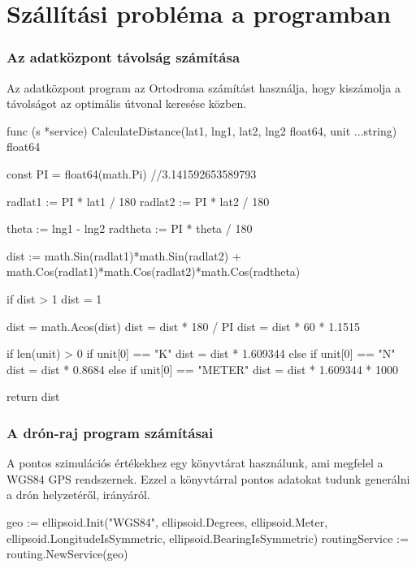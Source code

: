 \newpage

\section{Szállítási probléma a programban}
\subsubsection{Az adatközpont távolság számítása}
Az adatközpont program az Ortodroma számítást használja, hogy kiszámolja a távolságot az optimális útvonal keresése közben.
\begin{python}
    func (s *service) CalculateDistance(lat1, lng1, lat2,
    lng2 float64, unit ...string) float64 {
        const PI = float64(math.Pi) //3.141592653589793

        radlat1 := PI * lat1 / 180
        radlat2 := PI * lat2 / 180

        theta := lng1 - lng2
        radtheta := PI * theta / 180

        dist := math.Sin(radlat1)*math.Sin(radlat2) +
        math.Cos(radlat1)*math.Cos(radlat2)*math.Cos(radtheta)

        if dist > 1 {
            dist = 1
        }

        dist = math.Acos(dist)
        dist = dist * 180 / PI
        dist = dist * 60 * 1.1515

        if len(unit) > 0 {
            if unit[0] == "K" {
                dist = dist * 1.609344
            } else if unit[0] == "N" {
                dist = dist * 0.8684
            } else if unit[0] == "METER" {
                dist = dist * 1.609344 * 1000
            }
        }

        return dist
    }
\end{python}
\subsubsection{A drón-raj program számításai}
A pontos szimulációs értékekhez egy könyvtárat használunk, ami megfelel a WGS84 GPS rendszernek.
Ezzel a könyvtárral pontos adatokat tudunk generálni a drón helyzetéről, irányáról.

\begin{python}
    geo := ellipsoid.Init("WGS84", ellipsoid.Degrees, ellipsoid.Meter,
    ellipsoid.LongitudeIsSymmetric, ellipsoid.BearingIsSymmetric)
    routingService := routing.NewService(geo)
\end{python}

